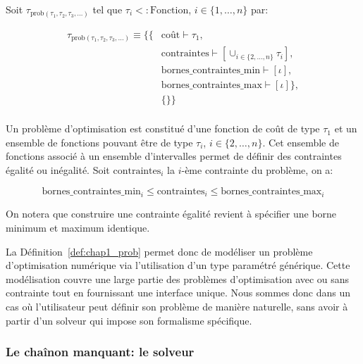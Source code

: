 \begin{mydef}\label{def:chap1_prob}
  Soit $\tau_{\text{prob}(\tau_1, \tau_2, \tau_3, \dotsc)}$ tel que
  $\tau_i <: \text{Fonction}$, $i \in \{1, \dotsc, n\}$ par:

  \begin{equation}
  \begin{split}
    \tau_{\text{prob}(\tau_1, \tau_2, \tau_3, \dotsc)} \equiv
    \{ \{ & \text{coût} \vdash \tau_1,\\
    & \text{contraintes} \vdash [\cup_{i \in \{2, \dotsc, n\}} \tau_i],\\
    & \text{bornes\_contraintes\_min} \vdash [\iota], \\
    & \text{bornes\_contraintes\_max} \vdash [\iota] \},\\
    & \{ \} \}\\
  \end{split}
  \end{equation}

  Un problème d'optimisation est constitué d'une fonction de coût de
  type $\tau_1$ et un ensemble de fonctions pouvant être de type
  $\tau_i$, $i \in \{2, \dotsc, n\}$. Cet ensemble de fonctions
  associé à un ensemble d'intervalles permet de définir des
  contraintes égalité ou inégalité. Soit $\text{contraintes}_i$ la
  $i$-ème contrainte du problème, on a:

  \begin{equation}
    \text{bornes\_contraintes\_min}_i \leq \text{contraintes}_i \leq
    \text{bornes\_contraintes\_max}_i
  \end{equation}

  On notera que construire une contrainte égalité revient à spécifier
  une borne minimum et maximum identique.
\end{mydef}


La Définition \ref{def:chap1_prob} permet donc de modéliser un
problème d'optimisation numérique via l'utilisation d'un type
paramétré générique. Cette modélisation couvre une large partie des
problèmes d'optimisation avec ou sans contrainte tout en fournissant
une interface unique. Nous sommes donc dans un cas où l'utilisateur
peut définir son problème de manière naturelle, sans avoir à partir
d'un solveur qui impose son formalisme spécifique.


\subsubsection{Le chaînon manquant: le solveur}
\label{sec:chap1_model2impl_typage_info_solv}


